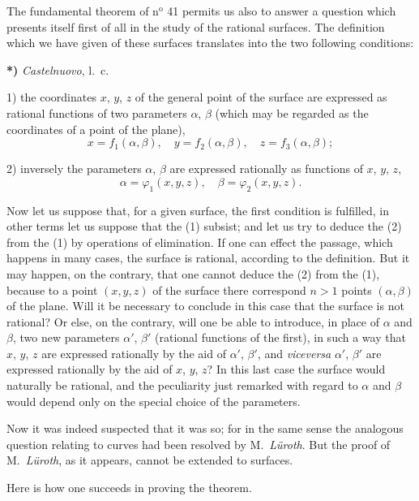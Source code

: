 \documentclass{article}
\begin{document}
The fundamental theorem of n${}^{\text{o}}$ 41 permits us also to answer a question which presents itself first of all in the study of the rational surfaces. The definition which we have given of these surfaces translates into the two following conditions:

\textbf{*)} \emph{Castelnuovo}, l.\ c.


1) the coordinates $x$, $y$, $z$ of the general point of the surface are expressed as rational functions of two parameters $\alpha$, $\beta$ (which may be regarded as the coordinates of a point of the plane),
\[ x = f_{1}(\alpha, \beta), \quad y = f_{2}(\alpha, \beta), \quad z = f_{3}(\alpha, \beta); \tag{1} \]

2) inversely the parameters $\alpha$, $\beta$ are expressed rationally as functions of $x$, $y$, $z$,
\[ \alpha = \varphi_{1}(x, y, z), \quad \beta = \varphi_{2}(x, y, z). \tag{2} \]

Now let us suppose that, for a given surface, the first condition is fulfilled, in other terms let us suppose that the (1) subsist; and let us try to deduce the (2) from the (1) by operations of elimination. If one can effect the passage, which happens in many cases, the surface is rational, according to the definition. But it may happen, on the contrary, that one cannot deduce the (2) from the (1), because to a point $(x, y, z)$ of the surface there correspond $n > 1$ points $(\alpha, \beta)$ of the plane. Will it be necessary to conclude in this case that the surface is not rational? Or else, on the contrary, will one be able to introduce, in place of $\alpha$ and $\beta$, two new parameters $\alpha'$, $\beta'$ (rational functions of the first), in such a way that $x$, $y$, $z$ are expressed rationally by the aid of $\alpha'$, $\beta'$, and \emph{viceversa} $\alpha'$, $\beta'$ are expressed rationally by the aid of $x$, $y$, $z$? In this last case the surface would naturally be rational, and the peculiarity just remarked with regard to $\alpha$ and $\beta$ would depend only on the special choice of the parameters.

Now it was indeed suspected that it was so; for in the same sense the analogous question relating to curves had been resolved by M.\ \emph{Lüroth}. But the proof of M.\ \emph{Lüroth}, as it appears, cannot be extended to surfaces.

Here is how one succeeds in proving the theorem.
\end{document}
